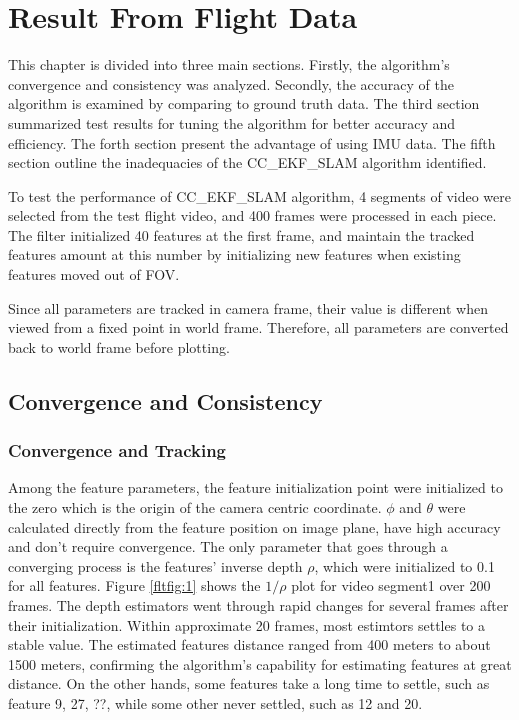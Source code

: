 \chapter{Result From Flight Data}\label{ch:FlightResult}

This chapter is divided into three main sections. Firstly, the
algorithm's convergence and consistency was analyzed. Secondly, the
accuracy of the algorithm is examined by comparing to ground truth
data. The third section summarized test results for tuning the
algorithm for better accuracy and efficiency. The forth section
present the advantage of using IMU data. The fifth section outline
the inadequacies of the CC\_EKF\_SLAM algorithm identified.

To test the performance of CC\_EKF\_SLAM algorithm, 4 segments of video
were selected from the test flight video, and 400 frames were
processed in each piece. The filter initialized 40 features at the
first frame, and maintain the tracked features amount at this number
by initializing new features when existing features moved out of FOV.

Since all parameters are tracked in camera frame, their value is 
different when viewed from a fixed point in world frame. Therefore, all 
parameters are converted back to world frame before plotting. 

\section{Convergence and Consistency}

\subsection{Convergence and Tracking}
Among the feature parameters, the feature initialization point were
initialized to the zero which is the origin of the camera centric
coordinate. $\phi$ and $\theta$ were calculated directly from the
feature position on image plane, have high accuracy and don't require
convergence. The only parameter that goes through a converging process
is the features' inverse depth $\rho$, which were initialized to 0.1
for all features. Figure \ref{fltfig:1} shows the $1/\rho$ plot for
video segment1 over 200 frames. The depth estimators went through
rapid changes for several frames after their initialization. Within
approximate 20 frames, most estimtors settles to a stable value. The
estimated features distance ranged from 400 meters to about 1500
meters, confirming the algorithm's capability for estimating features
at great distance. On the other hands, some features take a long time
to settle, such as feature 9, 27, ??, while some other never settled,
such as 12 and 20.

